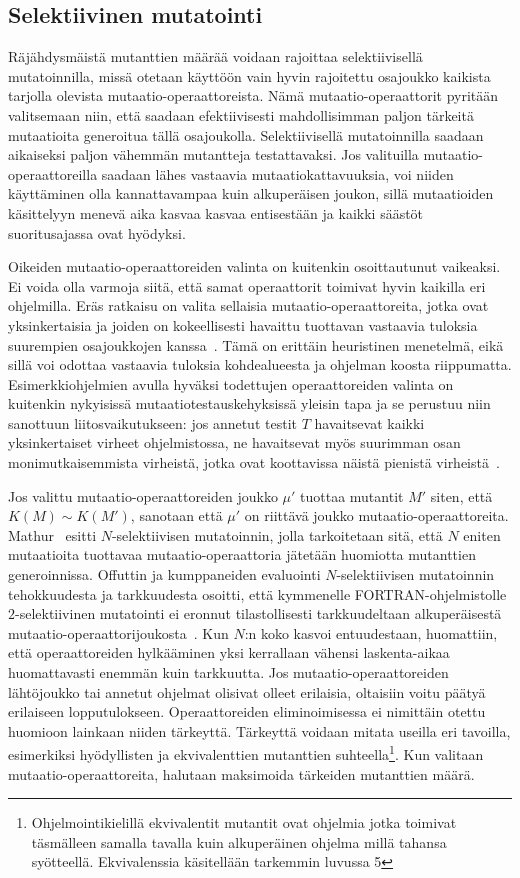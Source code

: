 \documentclass[finnish]{tktltiki2}
\begin{document}
\subsection{Selektiivinen mutatointi}
Räjähdysmäistä mutanttien määrää voidaan rajoittaa selektiivisellä mutatoinnilla, missä otetaan käyttöön vain hyvin rajoitettu osajoukko kaikista tarjolla olevista mutaatio-operaattoreista. Nämä mutaatio-operaattorit pyritään valitsemaan niin, että saadaan efektiivisesti mahdollisimman paljon tärkeitä mutaatioita generoitua tällä osajoukolla. Selektiivisellä mutatoinnilla saadaan aikaiseksi paljon vähemmän mutantteja testattavaksi. Jos valituilla mutaatio-operaattoreilla saadaan lähes vastaavia mutaatiokattavuuksia, voi niiden käyttäminen olla kannattavampaa kuin alkuperäisen joukon, sillä mutaatioiden käsittelyyn menevä aika kasvaa kasvaa entisestään ja kaikki säästöt suoritusajassa ovat hyödyksi.

Oikeiden mutaatio-operaattoreiden valinta on kuitenkin osoittautunut vaikeaksi. Ei voida olla varmoja siitä, että samat operaattorit toimivat hyvin kaikilla eri ohjelmilla. Eräs ratkaisu on valita sellaisia mutaatio-operaattoreita, jotka ovat yksinkertaisia ja joiden on kokeellisesti havaittu tuottavan vastaavia tuloksia suurempien osajoukkojen kanssa~\cite{GrunSZ09}. Tämä on erittäin heuristinen menetelmä, eikä sillä voi odottaa vastaavia tuloksia kohdealueesta ja ohjelman koosta riippumatta. Esimerkkiohjelmien avulla hyväksi todettujen operaattoreiden valinta on kuitenkin nykyisissä mutaatiotestauskehyksissä yleisin tapa ja se perustuu niin sanottuun liitosvaikutukseen: jos annetut testit $T$ havaitsevat kaikki yksinkertaiset virheet ohjelmistossa, ne havaitsevat myös suurimman osan monimutkaisemmista virheistä, jotka ovat koottavissa näistä pienistä virheistä~\cite{DeMilloLS78}. 

Jos valittu mutaatio-operaattoreiden joukko $\mu'$ tuottaa mutantit $M'$ siten, että $K(M) \sim K(M')$, sanotaan että $\mu'$ on riittävä joukko mutaatio-operaattoreita. Mathur~\cite{Mathur91} esitti $N$-selektiivisen mutatoinnin, jolla tarkoitetaan sitä, että $N$ eniten mutaatioita tuottavaa mutaatio-operaattoria jätetään huomiotta mutanttien generoinnissa. Offuttin ja kumppaneiden evaluointi $N$-selektiivisen mutatoinnin tehokkuudesta ja tarkkuudesta osoitti, että kymmenelle FORTRAN-ohjelmistolle $2$-selektiivinen mutatointi ei eronnut tilastollisesti tarkkuudeltaan alkuperäisestä mutaatio-operaattori\-joukosta~\cite{OffuttRZ93}. Kun $N$:n koko kasvoi entuudestaan, huomattiin, että operaattoreiden hylkääminen yksi kerrallaan vähensi laskenta-aikaa huomattavasti enemmän kuin tarkkuutta. Jos mutaatio-operaattoreiden lähtöjoukko tai annetut ohjelmat olisivat olleet erilaisia, oltaisiin voitu päätyä erilaiseen lopputulokseen. Operaattoreiden eliminoimisessa ei nimittäin otettu huomioon lainkaan niiden tärkeyttä. Tärkeyttä voidaan mitata useilla eri tavoilla, esimerkiksi hyödyllisten ja ekvivalenttien mutanttien suhteella\footnote{Ohjelmointikielillä ekvivalentit mutantit ovat ohjelmia jotka toimivat täsmälleen samalla tavalla kuin alkuperäinen ohjelma millä tahansa syötteellä. Ekvivalenssia käsitellään tarkemmin luvussa 5}. Kun valitaan mutaatio-operaattoreita, halutaan maksimoida tärkeiden mutanttien määrä.
\end{document}
